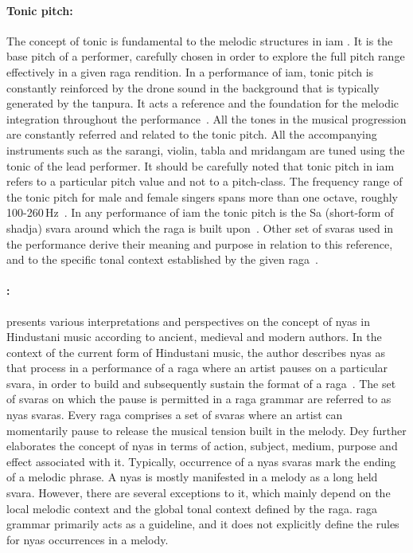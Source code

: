 \paragraph{Tonic pitch:} The concept of tonic is fundamental to the melodic structures in \gls{iam} \citep{Viswanathan2004,Danielou2010}. It is the base pitch of a performer, carefully chosen in order to explore the full pitch range effectively in a given \gls{raga} rendition. In a performance of \gls{iam}, tonic pitch is constantly reinforced by the drone sound in the background that is typically generated by the \gls{tanpura}. It acts a reference and the foundation for the melodic integration throughout the performance~\citep{Deva1980}. All the tones in the musical progression are constantly referred and related to the tonic pitch. All the accompanying instruments such as the \gls{sarangi}, violin, \gls{tabla} and \gls{mridangam} are tuned using the tonic of the lead performer. It should be carefully noted that tonic pitch in \gls{iam} refers to a particular pitch value and not to a pitch-class. The frequency range of the tonic pitch for male and female singers spans more than one octave, roughly 100-260\,Hz~\citep{Sengupta2005b}. In any performance of \gls{iam} the tonic pitch is the Sa (short-form of \gls{shadja}) \gls{svara} around which the \gls{raga} is built upon~\citep{Danielou2010,Bagchee1998}. Other set of \glspl{svara} used in the performance derive their meaning and purpose in relation to this reference, and to the specific tonal context established by the given \gls{raga}~\citep{Deva1980}. 

\paragraph{:} \cite{Dey2008} presents various interpretations and perspectives on the concept of \gls{nyas} in Hindustani music according to ancient, medieval and modern authors. In the context of the current form of Hindustani music, the author describes \gls{nyas} as that process in a performance of a \gls{raga} where an artist pauses on a particular \gls{svara}, in order to build and subsequently sustain the format of a \gls{raga}~\citep[p. 70]{Dey2008}. The set of \glspl{svara} on which the pause is permitted in a \gls{raga} grammar are referred to as \gls{nyas} \glspl{svara}. Every \gls{raga} comprises a set of \glspl{svara} where an artist can momentarily pause to release the musical tension built in the melody. Dey further elaborates the concept of \gls{nyas} in terms of action, subject, medium, purpose and effect associated with it. Typically, occurrence of a \gls{nyas} \glspl{svara} mark the ending of a melodic phrase. A \gls{nyas} is mostly manifested in a melody as a long held \gls{svara}. However, there are several exceptions to it, which mainly depend on the local melodic context and the global tonal context defined by the \gls{raga}. \Gls{raga} grammar primarily acts as a guideline, and it does not explicitly define the rules for \gls{nyas} occurrences in a melody. 


